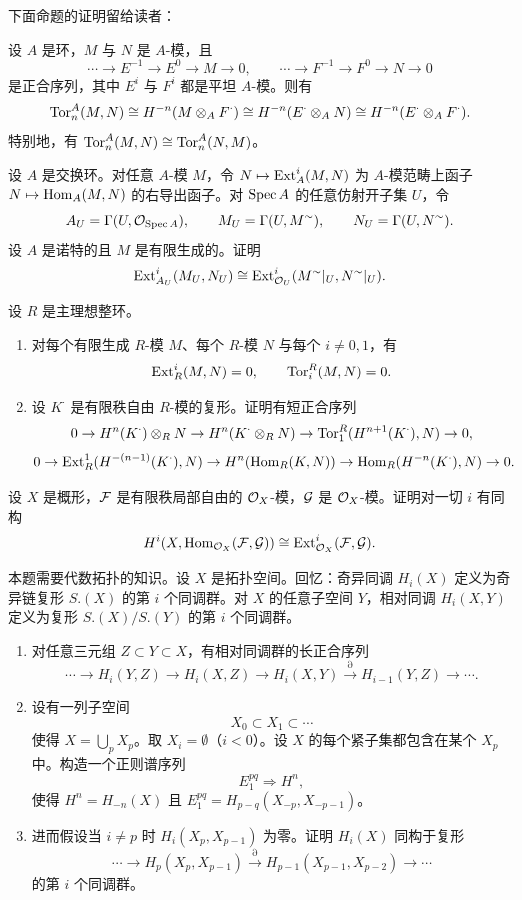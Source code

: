 下面命题的证明留给读者：

\begin{proposition}\label{it:2.2.17}
设 $A$ 是环，$M$ 与 $N$ 是 $A$-模，且
\[
\cdots\to E^{-1}\to E^0\to M\to 0,\qquad\cdots\to F^{-1}\to F^0\to N\to 0
\]
是正合序列，其中 $E^i$ 与 $F^i$ 都是平坦 $A$-模。则有
\[
\operatorname{Tor}_n^A(M,N)\cong H^{-n}(M\otimes_A F^{\cdot})\cong H^{-n}(E^{\cdot}\otimes_A N)\cong H^{-n}(E^{\cdot}\otimes_A F^{\cdot}).
\]
特别地，有 $\operatorname{Tor}_n^A(M,N)\cong\operatorname{Tor}_n^A(N,M)$。
\end{proposition}

\begin{exercises}
  \item \label{ex:2.2.1}
  设 $A$ 是交换环。对任意 $A$-模 $M$，令 $N\mapsto\operatorname{Ext}_A^i(M,N)$ 为 $A$-模范畴上函子 $N\mapsto\operatorname{Hom}_A(M,N)$ 的右导出函子。对 $\operatorname{Spec} A$ 的任意仿射开子集 $U$，令
  \[
  A_U=\Gamma(U,\mathcal{O}_{\operatorname{Spec} A}),\qquad M_U=\Gamma(U,M^{\sim}),\qquad N_U=\Gamma(U,N^{\sim}).
  \]
  设 $A$ 是诺特的且 $M$ 是有限生成的。证明
  \[
  \operatorname{Ext}_{A_U}^i(M_U,N_U)\cong\operatorname{Ext}_{\mathcal{O}_U}^i(M^{\sim}|_U,N^{\sim}|_U).
  \]
  \item \label{ex:2.2.2}
  设 $R$ 是主理想整环。
  \begin{enumerate}[label=(\arabic*),leftmargin=2.2em]
    \item 对每个有限生成 $R$-模 $M$、每个 $R$-模 $N$ 与每个 $i\ne 0,1$，有
    \[
    \operatorname{Ext}_R^i(M,N)=0,\qquad \operatorname{Tor}_i^R(M,N)=0.
    \]
    \item 设 $K^{\cdot}$ 是有限秩自由 $R$-模的复形。证明有短正合序列
    \[
    0\to H^n(K^{\cdot})\otimes_R N\to H^n(K^{\cdot}\otimes_R N)\to\operatorname{Tor}_1^R(H^{n+1}(K^{\cdot}),N)\to 0,
    \]
    \[
    0\to\operatorname{Ext}_R^1(H^{-(n-1)}(K^{\cdot}),N)\to H^n(\operatorname{Hom}_R(K,N))\to\operatorname{Hom}_R(H^{-n}(K^{\cdot}),N)\to 0.
    \]
  \end{enumerate}
  \item \label{ex:2.2.3}
  设 $X$ 是概形，$\mathcal{F}$ 是有限秩局部自由的 $\mathcal{O}_X$-模，$\mathcal{G}$ 是 $\mathcal{O}_X$-模。证明对一切 $i$ 有同构
  \[
  H^i(X,\operatorname{Hom}_{\mathcal{O}_X}(\mathcal{F},\mathcal{G}))\cong\operatorname{Ext}_{\mathcal{O}_X}^i(\mathcal{F},\mathcal{G}).
  \]
  \item \label{ex:2.2.4}
  本题需要代数拓扑的知识。设 $X$ 是拓扑空间。回忆：奇异同调 $H_i(X)$ 定义为奇异链复形 $S.(X)$ 的第 $i$ 个同调群。对 $X$ 的任意子空间 $Y$，相对同调 $H_i(X,Y)$ 定义为复形 $S.(X)/S.(Y)$ 的第 $i$ 个同调群。
  \begin{enumerate}[label=(\arabic*),leftmargin=2.2em]
    \item 对任意三元组 $Z\subset Y\subset X$，有相对同调群的长正合序列
    \[
    \cdots\to H_i(Y,Z)\to H_i(X,Z)\to H_i(X,Y)\xrightarrow{\partial}H_{i-1}(Y,Z)\to\cdots.
    \]
    \item 设有一列子空间
    \[
    X_0\subset X_1\subset\cdots
    \]
    使得 $X=\bigcup_p X_p$。取 $X_i=\emptyset$（$i<0$）。设 $X$ 的每个紧子集都包含在某个 $X_p$ 中。构造一个正则谱序列
    \[
    E_1^{pq}\Rightarrow H^n,
    \]
    使得 $H^n=H_{-n}(X)$ 且 $E_1^{pq}=H_{p-q}(X_{-p},X_{-p-1})$。
    \item 进而假设当 $i\ne p$ 时 $H_i(X_p,X_{p-1})$ 为零。证明 $H_i(X)$ 同构于复形
    \[
    \cdots\to H_p(X_p,X_{p-1})\xrightarrow{\partial}H_{p-1}(X_{p-1},X_{p-2})\to\cdots
    \]
    的第 $i$ 个同调群。
  \end{enumerate}
\end{exercises}


